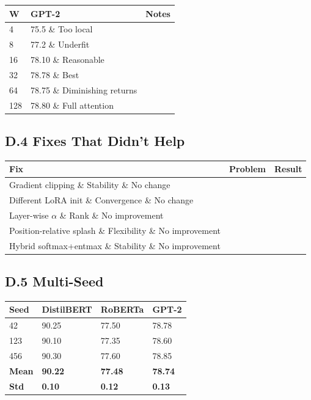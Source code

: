 \begin{table}[H]
\centering
\small
\begin{tabular}{lll}
\toprule
\textbf{W} & \textbf{GPT-2} & \textbf{Notes} \\
\midrule
4 & 75.5 \& Too local \\
8 & 77.2 \& Underfit \\
16 & 78.10 \& Reasonable \\
32 & 78.78 \& Best \\
64 & 78.75 \& Diminishing returns \\
128 & 78.80 \& Full attention \\
\bottomrule
\end{tabular}
\end{table}

\subsection{D.4 Fixes That Didn't Help}

\begin{table}[H]
\centering
\small
\begin{tabular}{lll}
\toprule
\textbf{Fix} & \textbf{Problem} & \textbf{Result} \\
\midrule
Gradient clipping \& Stability \& No change \\
Different LoRA init \& Convergence \& No change \\
Layer-wise $\alpha$ \& Rank \& No improvement \\
Position-relative splash \& Flexibility \& No improvement \\
Hybrid softmax+entmax \& Stability \& No improvement \\
\bottomrule
\end{tabular}
\end{table}

\subsection{D.5 Multi-Seed}

\begin{table}[H]
\centering
\small
\begin{tabular}{llll}
\toprule
\textbf{Seed} & \textbf{DistilBERT} & \textbf{RoBERTa} & \textbf{GPT-2} \\
\midrule
42 & 90.25 & 77.50 & 78.78 \\
123 & 90.10 & 77.35 & 78.60 \\
456 & 90.30 & 77.60 & 78.85 \\
\textbf{Mean} & \textbf{90.22} & \textbf{77.48} & \textbf{78.74} \\
\textbf{Std} & \textbf{0.10} & \textbf{0.12} & \textbf{0.13} \\
\bottomrule
\end{tabular}
\end{table}

